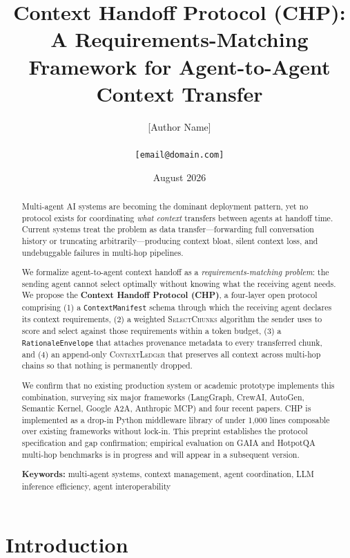 \documentclass[11pt]{article}
\title{\textbf{Context Handoff Protocol (CHP): A Requirements-Matching\\
Framework for Agent-to-Agent Context Transfer}}
\author{
  [Author Name]\\
  [Institution / Independent Researcher]\\
  \texttt{[email@domain.com]}
}
\date{August 2026}
\begin{document}
\maketitle

\begin{abstract}
Multi-agent AI systems are becoming the dominant deployment pattern, yet no
protocol exists for coordinating \emph{what context} transfers between agents
at handoff time. Current systems treat the problem as data transfer—forwarding
full conversation history or truncating arbitrarily—producing context bloat,
silent context loss, and undebuggable failures in multi-hop pipelines.

We formalize agent-to-agent context handoff as a \emph{requirements-matching
problem}: the sending agent cannot select optimally without knowing what the
receiving agent needs. We propose the \textbf{Context Handoff Protocol (CHP)},
a four-layer open protocol comprising (1) a \texttt{ContextManifest} schema
through which the receiving agent declares its context requirements, (2) a
weighted \textsc{SelectChunks} algorithm the sender uses to score and select
against those requirements within a token budget, (3) a
\texttt{RationaleEnvelope} that attaches provenance metadata to every
transferred chunk, and (4) an append-only \textsc{ContextLedger} that
preserves all context across multi-hop chains so that nothing is permanently
dropped.

We confirm that no existing production system or academic prototype implements
this combination, surveying six major frameworks (LangGraph, CrewAI, AutoGen,
Semantic Kernel, Google A2A, Anthropic MCP) and four recent papers. CHP is
implemented as a drop-in Python middleware library of under 1{,}000 lines
composable over existing frameworks without lock-in. This preprint establishes
the protocol specification and gap confirmation; empirical evaluation on GAIA
and HotpotQA multi-hop benchmarks is in progress and will appear in a
subsequent version.

\noindent\textbf{Keywords:} multi-agent systems, context management, agent
coordination, LLM inference efficiency, agent interoperability
\end{abstract}

\tableofcontents
\newpage

\section{Introduction}
\label{sec:intro}
\end{document}
